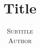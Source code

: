 \documentclass[twoside]{article}
\title{\vspace{-15mm}\fontsize{24pt}{10pt}\selectfont\textbf{Title}}
\author{
\large
\textsc{Subtitle}\\[2mm]
\textsc{Author}\\[2mm]
\vspace{-5mm}
}
\date{}
\begin{document}
\maketitle %


\begin{abstract}

\noindent \lipsum[1]

\end{abstract}

\end{document}

